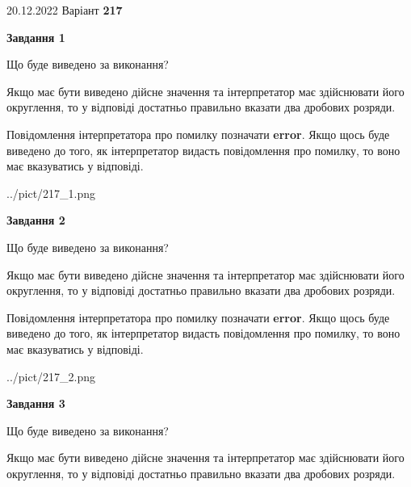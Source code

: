 \documentclass[12pt, ukrainian]{article}
\begin{document}
{20.12.2022 Варіант \No \textbf { 217 }\par}
{
\begin {Large}

{\begin {center}\textbf{Завдання 1}\end {center}}\par
Що буде виведено за виконання? \par

Якщо має бути виведено дійсне значення та інтерпретатор має здійснювати його округлення, 
то у відповіді достатньо правильно вказати два дробових розряди.

Повідомлення інтерпретатора про помилку позначати \textbf{error}.
Якщо щось буде виведено до того, як інтерпретатор видасть повідомлення про помилку, 
то воно має вказуватись у відповіді. \par

\begin{center}
	{../pict/217_1.png}
\end{center}
\newpage

{\begin {center}\textbf{Завдання 2}\end {center}}\par
Що буде виведено за виконання? \par

Якщо має бути виведено дійсне значення та інтерпретатор має здійснювати його округлення, 
то у відповіді достатньо правильно вказати два дробових розряди.

Повідомлення інтерпретатора про помилку позначати \textbf{error}.
Якщо щось буде виведено до того, як інтерпретатор видасть повідомлення про помилку, 
то воно має вказуватись у відповіді. \par

\begin{center}
	{../pict/217_2.png}
\end{center}
\newpage

{\begin {center}\textbf{Завдання 3}\end {center}}\par
Що буде виведено за виконання? \par

Якщо має бути виведено дійсне значення та інтерпретатор має здійснювати його округлення, 
то у відповіді достатньо правильно вказати два дробових розряди.


\end{Large}}
\end{document}
